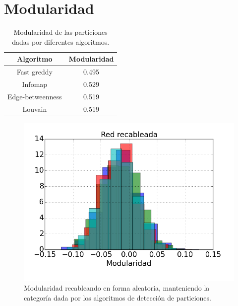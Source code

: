 \section{Modularidad}

\begin{table}
\centering
\begin{tabular}{c c}
\hline \hline
Algoritmo & Modularidad \\
\hline
Fast greddy & 0.495 \\
Infomap & 0.529 \\
Edge-betweenness & 0.519 \\
Louvain & 0.519 \\
\hline\hline
\end{tabular}
\caption{Modularidad de las particiones dadas por diferentes algoritmos.}
\label{table:Modularidad}
\end{table}


\begin{figure}
\centering
\includegraphics[scale = 0.5]{figuras/Modularidad_random}
\caption{Modularidad recableando en forma aleatoria, manteniendo la categoría dada por los algoritmos de detección de particiones.}
\label{fig:Modularidad_random}
\end{figure}

